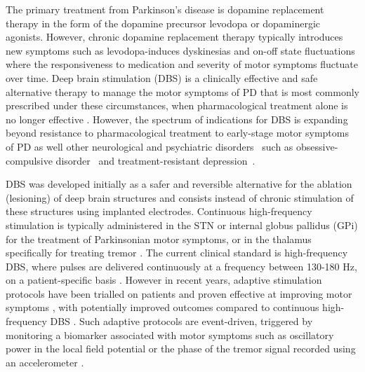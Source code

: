 The primary treatment from Parkinson's disease is dopamine replacement therapy
in the form of the dopamine precursor levodopa or dopaminergic agonists. However,
chronic dopamine replacement therapy typically introduces new symptoms such as
levodopa-induces dyskinesias and on-off state fluctuations where the responsiveness
to medication and severity of motor symptoms fluctuate over time.
Deep brain stimulation (DBS) is a clinically effective and safe alternative therapy
to manage the motor symptoms of PD that is most commonly prescribed under these
circumstances, when pharmacological treatment alone is no longer effective \cite{pizzolato_deep_2012,bronstein_deep_2011,weaver_bilateral_2009,benabid_deep_2009}. %
However, the spectrum of
indications for DBS is expanding beyond resistance to pharmacological treatment
to early-stage motor symptoms of PD \cite{schuepbach_neurostimulation_2013,hacker_deep_2015}
as well other neurological and psychiatric disorders~\cite{lyons_deep_2011,krack_deep_2010}
such as obsessive-compulsive disorder~\cite{greenberg_deep_2010} and treatment-resistant
depression~\cite{mayberg_deep_2005}.
%
%

%
DBS was developed initially as a safer and reversible alternative for the ablation
(lesioning) of deep brain structures and consists instead of chronic stimulation
of these structures using implanted electrodes. Continuous high-frequency stimulation is
typically administered in the STN or internal globus pallidus (GPi) for the treatment
of Parkinsonian motor symptoms, or in the thalamus specifically for treating tremor
\cite{wichmann_deep_2016}. The current clinical standard is high-frequency DBS, where
pulses are delivered continuously at a frequency between 130-180 Hz, on a patient-specific
basis \cite{moro_impact_2002,timmermann_ten-hertz_2004,limousin_effect_1995}.
However in recent years, adaptive stimulation protocols have been trialled on patients
and proven effective at improving motor symptoms \cite{little_adaptive_2013,cagnan_stimulating_2017},
with potentially improved outcomes compared to continuous high-frequency DBS \cite{little_adaptive_2016}.
Such adaptive protocols are event-driven, triggered by monitoring a biomarker
associated with motor symptoms such as oscillatory power in the local field potential
\cite{little_adaptive_2013} or the phase of the tremor signal recorded using an
accelerometer \cite{cagnan_stimulating_2017}.

